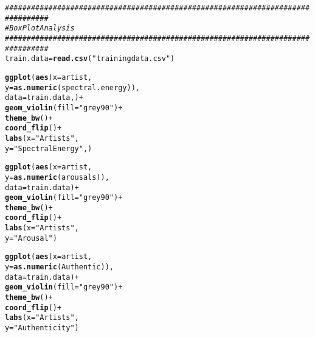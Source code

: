 \documentclass{article}\usepackage[]{graphicx}\usepackage[]{xcolor}
\makeatletter
\newcommand{\hlsng}[1]{\textcolor[rgb]{0.192,0.494,0.8}{#1}}%
\newcommand{\hlcom}[1]{\textcolor[rgb]{0.678,0.584,0.686}{\textit{#1}}}%
\newcommand{\hlopt}[1]{\textcolor[rgb]{0,0,0}{#1}}%
\newcommand{\hldef}[1]{\textcolor[rgb]{0.345,0.345,0.345}{#1}}%
\newcommand{\hlkwb}[1]{\textcolor[rgb]{0.69,0.353,0.396}{#1}}%
\newcommand{\hlkwc}[1]{\textcolor[rgb]{0.333,0.667,0.333}{#1}}%
\newcommand{\hlkwd}[1]{\textcolor[rgb]{0.737,0.353,0.396}{\textbf{#1}}}%
\newenvironment{kframe}{%
 \def\at@end@of@kframe{}%
 \ifinner\ifhmode%
  \def\at@end@of@kframe{\end{minipage}}%
  \begin{minipage}{\columnwidth}%
 \fi\fi%
 \def\FrameCommand##1{\hskip\@totalleftmargin \hskip-\fboxsep
 \colorbox{shadecolor}{##1}\hskip-\fboxsep
     \hskip-\linewidth \hskip-\@totalleftmargin \hskip\columnwidth}%
 \MakeFramed {\advance\hsize-\width
   \@totalleftmargin\z@ \linewidth\hsize
   \@setminipage}}%
 {\par\unskip\endMakeFramed%
 \at@end@of@kframe}
\newenvironment{knitrout}{}{} %
\makeatother
\begin{document}
\begin{enumerate}
\begin{knitrout}
\begin{kframe}
\begin{alltt}
\hlcom{################################################################################}
\hlcom{#Box Plot Analysis}
\hlcom{################################################################################}
\hldef{train.data} \hlkwb{=} \hlkwd{read.csv}\hldef{(}\hlsng{"trainingdata.csv"}\hldef{)}

\hlkwd{ggplot}\hldef{(}\hlkwd{aes}\hldef{(}\hlkwc{x} \hldef{= artist,}
           \hlkwc{y} \hldef{=} \hlkwd{as.numeric}\hldef{(spectral.energy)),}
       \hlkwc{data} \hldef{= train.data,)} \hlopt{+}
  \hlkwd{geom_violin}\hldef{(}\hlkwc{fill} \hldef{=} \hlsng{"grey90"}\hldef{)} \hlopt{+}
  \hlkwd{theme_bw}\hldef{()} \hlopt{+}
  \hlkwd{coord_flip}\hldef{()} \hlopt{+}
  \hlkwd{labs}\hldef{(}\hlkwc{x} \hldef{=} \hlsng{"Artists"}\hldef{,}
       \hlkwc{y} \hldef{=} \hlsng{"Spectral Energy"}\hldef{,)}

\hlkwd{ggplot}\hldef{(}\hlkwd{aes}\hldef{(}\hlkwc{x} \hldef{= artist,}
           \hlkwc{y} \hldef{=} \hlkwd{as.numeric}\hldef{(arousals)),}
       \hlkwc{data} \hldef{= train.data)} \hlopt{+}
  \hlkwd{geom_violin}\hldef{(}\hlkwc{fill} \hldef{=} \hlsng{"grey90"}\hldef{)} \hlopt{+}
  \hlkwd{theme_bw}\hldef{()} \hlopt{+}
  \hlkwd{coord_flip}\hldef{()} \hlopt{+}
  \hlkwd{labs}\hldef{(}\hlkwc{x} \hldef{=} \hlsng{"Artists"}\hldef{,}
       \hlkwc{y} \hldef{=} \hlsng{"Arousal"}\hldef{)}

\hlkwd{ggplot}\hldef{(}\hlkwd{aes}\hldef{(}\hlkwc{x} \hldef{= artist,}
           \hlkwc{y} \hldef{=} \hlkwd{as.numeric}\hldef{(Authentic)),}
       \hlkwc{data} \hldef{= train.data)} \hlopt{+}
  \hlkwd{geom_violin}\hldef{(}\hlkwc{fill} \hldef{=} \hlsng{"grey90"}\hldef{)} \hlopt{+}
  \hlkwd{theme_bw}\hldef{()} \hlopt{+}
  \hlkwd{coord_flip}\hldef{()} \hlopt{+}
  \hlkwd{labs}\hldef{(}\hlkwc{x} \hldef{=} \hlsng{"Artists"}\hldef{,}
       \hlkwc{y} \hldef{=} \hlsng{"Authenticity"}\hldef{)}
\end{alltt}
\end{kframe}
\end{knitrout}
\end{enumerate}

\end{document}
